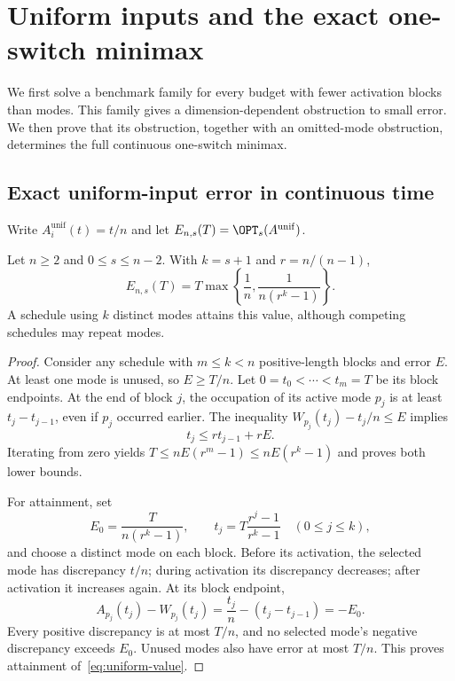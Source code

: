 \section{Uniform inputs and the exact one-switch minimax}\label{sec:one-switch}

We first solve a benchmark family for every budget with fewer activation
blocks than modes. This family gives a dimension-dependent obstruction to
small error. We then prove that its obstruction, together with an omitted-mode
obstruction, determines the full continuous one-switch minimax.

\subsection{Exact uniform-input error in continuous time}

Write $A^{\mathrm{unif}}_i(t)=t/n$ and let
$E_{n,s}(T)=\OPT_s(A^{\mathrm{unif}})$.

\begin{theorem}\label{thm:uniform}
Let $n\ge2$ and $0\le s\le n-2$. With $k=s+1$ and $r=n/(n-1)$,
\begin{equation}\label{eq:uniform-value}
 E_{n,s}(T)=T\max\left\{\frac1n,\frac{1}{n(r^k-1)}\right\}.
\end{equation}
A schedule using $k$ distinct modes attains this value, although competing
schedules may repeat modes.
\end{theorem}
\begin{proof}
Consider any schedule with $m\le k<n$ positive-length blocks and error $E$.
At least one mode is unused, so $E\ge T/n$. Let $0=t_0<\cdots<t_m=T$
be its block endpoints. At the end of block $j$, the occupation of its active
mode $p_j$ is at least $t_j-t_{j-1}$, even if $p_j$ occurred earlier.
The inequality $W_{p_j}(t_j)-t_j/n\le E$ implies
\begin{equation}\label{eq:uniform-reach}
 t_j\le r t_{j-1}+rE.
\end{equation}
Iterating from zero yields
$T\le nE(r^m-1)\le nE(r^k-1)$ and proves both lower bounds.

For attainment, set
\[
 E_0=\frac{T}{n(r^k-1)},\qquad
 t_j=T\frac{r^j-1}{r^k-1}\quad(0\le j\le k),
\]
and choose a distinct mode on each block. Before its activation, the
selected mode has discrepancy $t/n$; during activation its discrepancy
decreases; after activation it increases again. At its block endpoint,
\[
 A_{p_j}(t_j)-W_{p_j}(t_j)
 =\frac{t_j}{n}-(t_j-t_{j-1})=-E_0.
\]
Every positive discrepancy is at most $T/n$, and no selected mode's
negative discrepancy exceeds $E_0$. Unused modes also have error at most
$T/n$. This proves attainment of~\eqref{eq:uniform-value}.
\end{proof}

